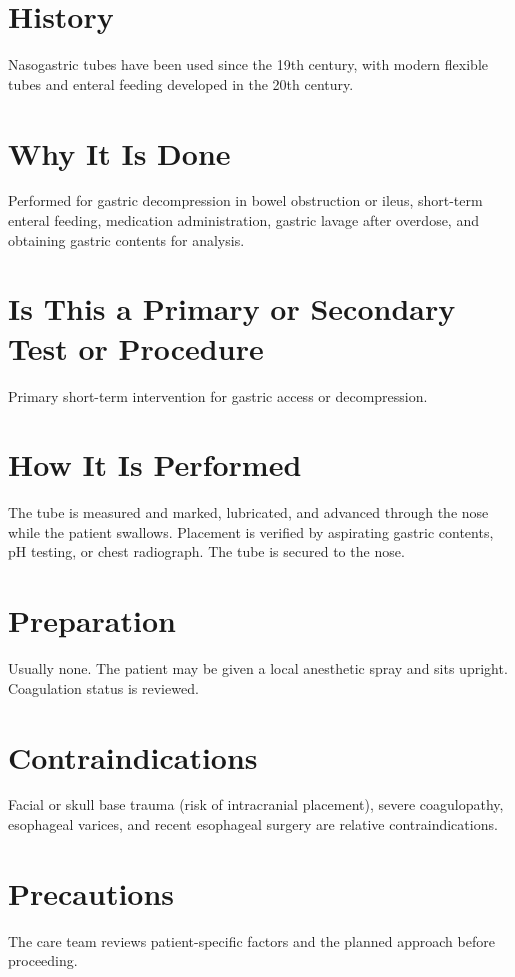 \section*{History}
Nasogastric tubes have been used since the 19th century, with modern flexible tubes and enteral feeding developed in the 20th century.

\section*{Why It Is Done}
Performed for gastric decompression in bowel obstruction or ileus, short-term enteral feeding, medication administration, gastric lavage after overdose, and obtaining gastric contents for analysis.

\section*{Is This a Primary or Secondary Test or Procedure}
Primary short-term intervention for gastric access or decompression.

\section*{How It Is Performed}
The tube is measured and marked, lubricated, and advanced through the nose while the patient swallows. Placement is verified by aspirating gastric contents, pH testing, or chest radiograph. The tube is secured to the nose.

\section*{Preparation}
Usually none. The patient may be given a local anesthetic spray and sits upright. Coagulation status is reviewed.

\section*{Contraindications}
Facial or skull base trauma (risk of intracranial placement), severe coagulopathy, esophageal varices, and recent esophageal surgery are relative contraindications.

\section*{Precautions}
The care team reviews patient-specific factors and the planned approach before proceeding.

